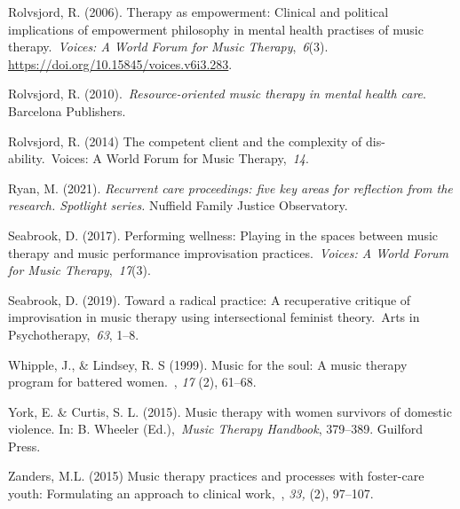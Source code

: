 \documentclass[authordate, empirical]{jote-new-article}
\begin{document}
	Rolvsjord, R. (2006). Therapy as empowerment: Clinical and political implications of empowerment philosophy in mental health practises of music therapy. \emph{Voices: A World Forum for Music Therapy}, \emph{6}(3). \href{https://doi.org/10.15845/voices.v6i3.283}{https://doi.org/10.15845/voices.v6i3.283}.







	Rolvsjord, R. (2010). \emph{Resource-oriented music therapy in mental health care}. Barcelona Publishers.







	Rolvsjord, R. (2014) The competent client and the complexity of dis-ability. Voices: A World Forum for Music Therapy, \emph{14}.







	Ryan, M. (2021). \emph{Recurrent care proceedings: five key areas for reflection from the research. Spotlight series.} Nuffield Family Justice Observatory.







	Seabrook, D. (2017). Performing wellness: Playing in the spaces between music therapy and music performance improvisation practices. \emph{Voices: A World Forum for Music Therapy}, \emph{17}(3).







	Seabrook, D. (2019). Toward a radical practice: A recuperative critique of improvisation in music therapy using intersectional feminist theory. Arts in Psychotherapy, \emph{63}, 1--8.







	Whipple, J., \& Lindsey, R. S (1999). Music for the soul: A music therapy program for battered women. , \emph{17} (2), 61--68.







	York, E. \& Curtis, S. L. (2015). Music therapy with women survivors of domestic violence. In: B. Wheeler (Ed.), \emph{Music Therapy Handbook}, 379--389. Guilford Press.







	Zanders, M.L. (2015) Music therapy practices and processes with foster-care youth: Formulating an approach to clinical work, , \emph{33,} (2), 97--107.
\end{document}
